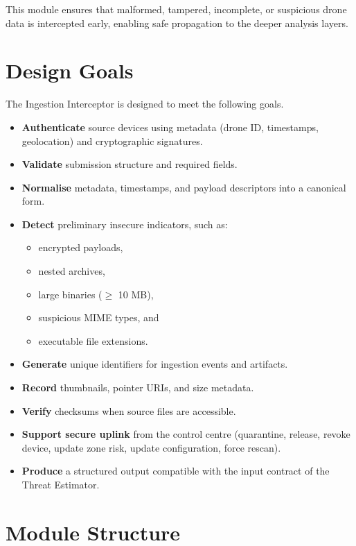 \documentclass[12pt, a4paper]{report}
\begin{document}
This module ensures that malformed, tampered, incomplete, or suspicious
drone data is intercepted early, enabling safe propagation to the deeper
analysis layers.

\section{Design Goals}

The Ingestion Interceptor is designed to meet the following goals.

\begin{itemize}
    \item \textbf{Authenticate} source devices using metadata (drone ID,
          timestamps, geolocation) and cryptographic signatures.
    \item \textbf{Validate} submission structure and required fields.
    \item \textbf{Normalise} metadata, timestamps, and payload descriptors
          into a canonical form.
    \item \textbf{Detect} preliminary insecure indicators, such as:
          \begin{itemize}
              \item encrypted payloads,
              \item nested archives,
              \item large binaries ($\geq$ 10 MB),
              \item suspicious MIME types, and
              \item executable file extensions.
          \end{itemize}
    \item \textbf{Generate} unique identifiers for ingestion events and
          artifacts.
    \item \textbf{Record} thumbnails, pointer URIs, and size metadata.
    \item \textbf{Verify} checksums when source files are accessible.
    \item \textbf{Support secure uplink} from the control centre
          (quarantine, release, revoke device, update zone risk, update
          configuration, force rescan).
    \item \textbf{Produce} a structured output compatible with the input
          contract of the Threat Estimator.
\end{itemize}

\section{Module Structure}
\end{document}
